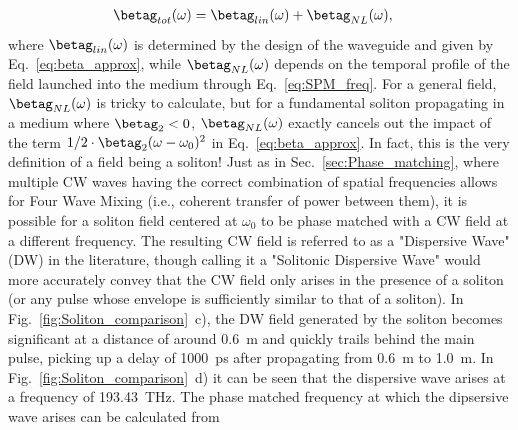 \begin{align}
\betag_{tot}(\omega) &= \betag_{lin}(\omega)+\betag_{NL}(\omega),    
\end{align}
where $\betag_{lin}(\omega)$ is determined by the design of the waveguide and given by Eq.~\ref{eq:beta_approx}, while $\betag_{NL}(\omega)$ depends on the temporal profile of the field launched into the medium through Eq.~\ref{eq:SPM_freq}. For a general field, $\betag_{NL}(\omega)$ is tricky to calculate, but for a fundamental soliton propagating in a medium where $\betag_2<0$, $\betag_{NL}(\omega)$ exactly cancels out the impact of the term $1/2\cdot\betag_2(\omega-\omega_0)^2$ in Eq.~\ref{eq:beta_approx}. In fact, this is the very definition of a field being a soliton! Just as in Sec.~\ref{sec:Phase_matching}, where multiple CW waves having the correct combination of spatial frequencies allows for Four Wave Mixing (i.e., coherent transfer of power between them), it is possible for a soliton field centered at $\omega_0$ to be phase matched with a CW field at a different frequency. The resulting CW field is referred to as a "Dispersive Wave" (DW) in the literature, though calling it a "Solitonic Dispersive Wave" would more accurately convey that the CW field only arises in the presence of a soliton (or any pulse whose envelope is sufficiently similar to that of a soliton). In Fig.~\ref{fig:Soliton_comparison}~c), the DW field generated by the soliton becomes significant at a distance of around 0.6~m and quickly trails behind the main pulse, picking up a delay of 1000~ps after propagating from 0.6~m to 1.0~m. In Fig.~\ref{fig:Soliton_comparison}~d) it can be seen that the dispersive wave arises at a frequency of 193.43~THz. The phase matched frequency at which the dipsersive wave arises can be calculated from

